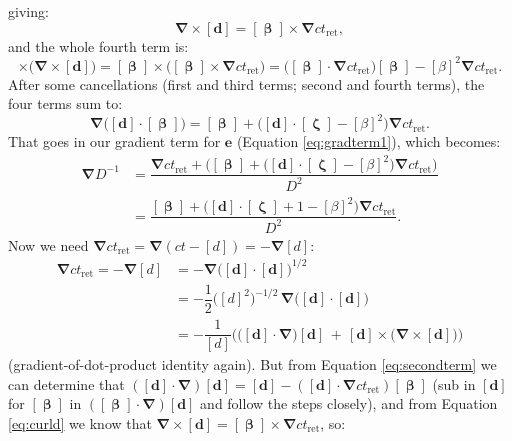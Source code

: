 \documentclass[12pt]{article}
\renewcommand{\vv}[1]{\mathbf{#1}}
\newcommand{\vvbeta}{\bm{\upbeta}}
\newcommand{\vvzeta}{\bm{\upzeta}}
\newcommand{\del}{\boldsymbol{\nabla}}
\begin{document}
giving:
\begin{equation}\label{eq:curld}
\del \times [\vv d] = [\vvbeta]  \times \del ct_{\mathrm{ret}} ,
\end{equation}
and the whole fourth term is:
\begin{equation*}
[\vvbeta] \times \big( \del \times [\vv d] \big) = [\vvbeta] \times \big( [\vvbeta]  \times \del ct_{\mathrm{ret}} \big) = \big( [\vvbeta] \cdot \del ct_{\mathrm{ret}} \big) [\vvbeta] - [\beta]^2 \del ct_{\mathrm{ret}} .
\end{equation*}
After some cancellations (first and third terms; second and fourth terms), the four terms sum to:
\begin{equation*}
\del \big( [\vv d] \cdot [\vvbeta] \big) = [\vvbeta] + \big( [\vv d] \cdot [\vvzeta] - [\beta]^2 \big) \del ct_{\mathrm{ret}} .
\end{equation*}
That goes in our gradient term for $\vv e$ (Equation \ref{eq:gradterm1}), which becomes:
\begin{equation}\label{eq:gradterm2}
\begin{split}
\del D^{-1} &= \dfrac{\del ct_{\mathrm{ret}} + \Big( [\vvbeta] + \big( [\vv d] \cdot [\vvzeta] - [\beta]^2 \big) \del ct_{\mathrm{ret}} \Big)}{D^{2}} \\[6pt]
&= \dfrac{[\vvbeta] + \big( [\vv d] \cdot [\vvzeta] + 1 - [\beta]^2 \big) \del ct_{\mathrm{ret}}}{D^{2}} .
\end{split}
\end{equation}
Now we need $\del ct_{\mathrm{ret}} = \del (ct - [d]) = - \del [d]$:
\begin{equation*}
\begin{aligned}
\del ct_{\mathrm{ret}} = - \del [d] &= - \del \big( [\vv d] \cdot [\vv d] \big)^{1/2} \\[4pt]
&= - \dfrac{1}{2} \big( [d]^2 \big)^{-1/2} \, \del \big( [\vv d] \cdot [\vv d] \big) \\[5pt]
&= - \dfrac{1}{[d]} \Big( \big( [\vv d] \cdot \del \big)[\vv d] \, + \, [\vv d] \times \big( \del \times [\vv d] \big) \Big)
\end{aligned}
\end{equation*}
(gradient-of-dot-product identity again). But from Equation \ref{eq:secondterm} we can determine that $( [\vv d] \cdot \del )[\vv d] = [\vv d] - ( [\vv d] \cdot \del ct_{\mathrm{ret}} ) [\vvbeta]$ (sub in $[\vv d]$ for $[\vvbeta]$ in $( [\vvbeta] \cdot \del ) [\vv d]$ and follow the steps closely), and from Equation \ref{eq:curld} we know that $\del \times [\vv d] = [\vvbeta] \times \del ct_{\mathrm{ret}}$, so:
\end{document}
